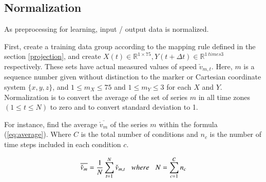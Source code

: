 \documentclass{sigchi}
\begin{document}
\subsection{Normalization}

As preprocessing for learning, input / output data is normalized.

First, create a training data group according to the mapping rule defined in the section \ref{projection}, and create $ X (t) \in \mathbb {R} ^ {1 \times 75}, Y (t + \Delta t) \in \mathbb {R} ^ {1 \ times 3} $ respectively. These sets have actual measured values of speed $ \check {v}_{m, t} $. Here, $ m $ is a sequence number given without distinction to the marker or Cartesian coordinate system $ \{x, y, z \} $, and $ 1 \leq m_X \leq 75$ and $ 1 \leq m_Y \leq 3 $ for each $ X $ and $ Y $. Normalization is to convert the average of the set of series $ m $ in all time zones $ (1 \leq t \leq N) $ to zero and to convert standard deviation to 1.

For instance, find the average $ \overline {\check {v}_{m}} $ of the series $ m $ within the formula (\ref{eq:average}). Where $ C $ is the total number of conditions and $ n_c $ is the number of time steps included in each condition $ c $.

\begin{equation}
\overline{\check{v}_{m}} = \frac{1}{N}\sum^{N}_{t=1}\check{v}_{m,t} 
 \hspace{3mm} where  \hspace{3mm}
N=\sum^{C}_{c=1} n_c 
\label{eq:average}
\end{equation}
\end{document}
